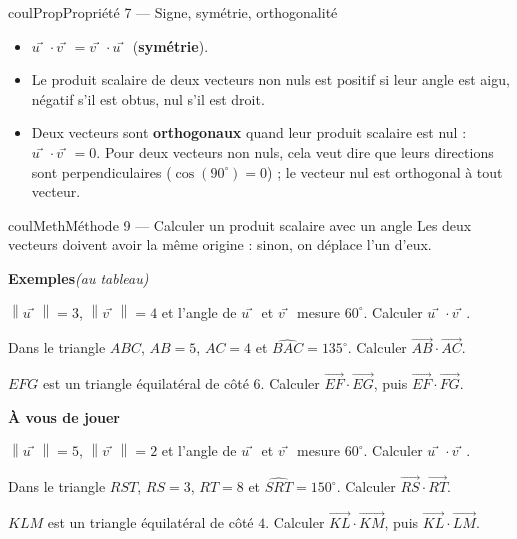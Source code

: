 \documentclass[11pt,a4paper]{article}
\makeatletter
\newcommand{\vect}[1]{\overrightarrow{#1}}
\newcommand{\norme}[1]{\left\lVert #1 \right\rVert}
\newcounter{lycee@signet}
\newcommand{\signet}[3][]{\stepcounter{lycee@signet}%
  \edef\lycee@dest{\if\relax\detokenize{#1}\relax
    signet.\arabic{lycee@signet}\else#1\fi}%
  \hypertarget{\lycee@dest}{}\bookmark[level=#2,dest=\lycee@dest]{#3}}
\def\vec#1{#1⃗}}%
\newcounter{methode}
\newenvironment{proprietebox}[1][Propriété]%
  {\begin{boitecours}[phantom={\signet{2}{#1}}]{coulProp}{#1}}{\end{boitecours}}
\newenvironment{methodebox}[1][Méthode]{\stepcounter{methode}%
  \begin{boitecours}[phantom={\signet[methode-\arabic{methode}]{2}{#1}}]{coulMeth}{#1}}%
  {\end{boitecours}}
\newcommand{\etape}[1]{\par\smallskip\textbf{\color{coulMeth}#1}\par\nobreak\smallskip}
\newcommand{\autableau}{\hfill{\footnotesize\itshape\color{black!45}(au tableau)}}
\newcommand{\etapeexemples}{%
    \par\smallskip\textbf{\color{coulMeth}Exemples}\autableau\par\nobreak\smallskip}
\makeatother
\begin{document}
\begin{proprietebox}[Propriété 7 --- Signe, symétrie, orthogonalité]
\begin{itemize}
  \item $\vec{u}\cdot\vec{v}=\vec{v}\cdot\vec{u}$ (\textbf{symétrie}).
  \item Le produit scalaire de deux vecteurs non nuls est positif si leur angle est
        aigu, négatif s'il est obtus, nul s'il est droit.
  \item Deux vecteurs sont \textbf{orthogonaux} quand leur produit scalaire est nul :
        $\vec{u}\cdot\vec{v}=0$. Pour deux vecteurs non nuls, cela veut dire que leurs
        directions sont perpendiculaires ($\cos(90^{\circ})=0$) ; le vecteur nul est
        orthogonal à tout vecteur.
\end{itemize}
\end{proprietebox}

\begin{methodebox}[Méthode 9 --- Calculer un produit scalaire avec un angle]
Les deux vecteurs doivent avoir la même origine : sinon, on déplace l'un d'eux.
\etapeexemples
\begin{questions}[label=\alph*)]
  \item $\norme{\vec{u}}=3$, $\norme{\vec{v}}=4$ et l'angle de $\vec{u}$ et $\vec{v}$
        mesure $60^{\circ}$. Calculer $\vec{u}\cdot\vec{v}$.
  \item Dans le triangle $ABC$, $AB=5$, $AC=4$ et $\widehat{BAC}=135^{\circ}$. Calculer
        $\vect{AB}\cdot\vect{AC}$.
  \item $EFG$ est un triangle équilatéral de côté $6$. Calculer $\vect{EF}\cdot\vect{EG}$,
        puis $\vect{EF}\cdot\vect{FG}$.
\end{questions}

\etape{À vous de jouer}
\begin{questions}[label=\alph*)]
  \item $\norme{\vec{u}}=5$, $\norme{\vec{v}}=2$ et l'angle de $\vec{u}$ et $\vec{v}$
        mesure $60^{\circ}$. Calculer $\vec{u}\cdot\vec{v}$.
  \item Dans le triangle $RST$, $RS=3$, $RT=8$ et $\widehat{SRT}=150^{\circ}$. Calculer
        $\vect{RS}\cdot\vect{RT}$.
  \item $KLM$ est un triangle équilatéral de côté $4$. Calculer $\vect{KL}\cdot\vect{KM}$,
        puis $\vect{KL}\cdot\vect{LM}$.
\end{questions}

\end{methodebox}
\end{document}
